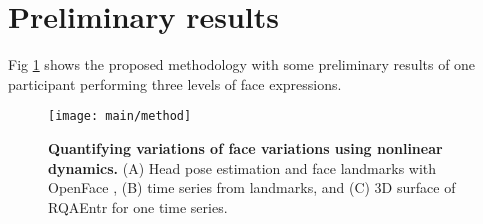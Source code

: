 \documentclass[12pt]{article}
\begin{document}
\section{Preliminary results}


Fig \ref{fig:method} shows the proposed methodology with 
some preliminary results of one participant performing three
levels of face expressions. 


\begin{figure}
\centering
\texttt{[image: main/method]}
    \caption{
	{\bf Quantifying variations of face variations using nonlinear dynamics.}
	(A) Head pose estimation and face landmarks with OpenFace \cite{baltrusaitis2018},
	(B) time series from landmarks, and
	(C) 3D surface of RQAEntr for one time series.
        }
\label{fig:method}
\end{figure}








\end{document}
